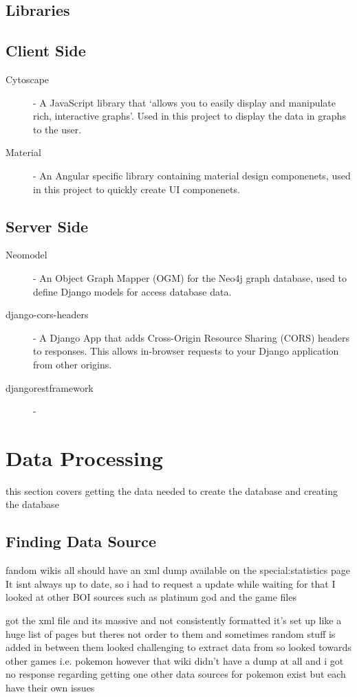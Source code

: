 \subsection{Libraries}
\subsection{Client Side}
\begin{description}
    \item[Cytoscape] - A JavaScript library that `allows you to easily display and manipulate rich, interactive graphs'\cite{franzCytoscapeJsGraph2016}. 
    Used in this project to display the data in graphs to the user.
    \item[Material] - An Angular specific library containing material design componenets, used in this project to quickly create UI componenets.
\end{description}
\subsection{Server Side}
\begin{description}
    \item[Neomodel] - An Object Graph Mapper (OGM) for the Neo4j graph database\cite{NeomodelDocumentationNeomodel}, used to define Django models for access database data.
    \item[django-cors-headers] - A Django App that adds Cross-Origin Resource Sharing (CORS) headers to responses. This allows in-browser requests to your Django application from other origins.
    \item[djangorestframework] - 
\end{description}
\section{Data Processing}
this section covers getting the data needed to create the database and creating the database
\subsection{Finding Data Source}
fandom wikis all should have an xml dump available on the special:statistics page
It isnt always up to date, so i had to request a update
while waiting for that I looked at other BOI sources such as platinum god and the game files

got the xml file and its massive and not consistently formatted
it's set up like a huge list of pages but theres not order to them and sometimes random stuff is added in between them
looked challenging to extract data from so looked towards other games i.e. pokemon
however that wiki didn't have a dump at all and i got no response regarding getting one
other data sources for pokemon exist but each have their own issues
